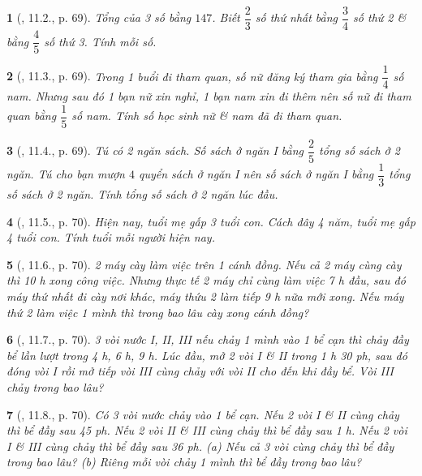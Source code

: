 \documentclass{article}
\newtheorem{baitoan}{}
\begin{document}
\begin{baitoan}[\cite{TLCT_THCS_Toan_6_so_hoc}, 11.2., p. 69]
	Tổng của 3 số bằng $147$. Biết $\dfrac{2}{3}$ số thứ nhất bằng $\dfrac{3}{4}$ số thứ 2 \& bằng $\dfrac{4}{5}$ số thứ 3. Tính mỗi số.
\end{baitoan}

\begin{baitoan}[\cite{TLCT_THCS_Toan_6_so_hoc}, 11.3., p. 69]
	Trong 1 buổi đi tham quan, số nữ đăng ký tham gia bằng $\dfrac{1}{4}$ số nam. Nhưng sau đó 1 bạn nữ xin nghỉ, 1 bạn nam xin đi thêm nên số nữ đi tham quan bằng $\dfrac{1}{5}$ số nam. Tính số học sinh nữ \& nam đã đi tham quan.
\end{baitoan}

\begin{baitoan}[\cite{TLCT_THCS_Toan_6_so_hoc}, 11.4., p. 69]
	Tú có 2 ngăn sách. Số sách ở ngăn I bằng $\dfrac{2}{5}$ tổng số sách ở 2 ngăn. Tú cho bạn mượn $4$ quyển sách ở ngăn I nên số sách ở ngăn I bằng $\dfrac{1}{3}$ tổng số sách ở 2 ngăn. Tính tổng số sách ở 2 ngăn lúc đầu.
\end{baitoan}

\begin{baitoan}[\cite{TLCT_THCS_Toan_6_so_hoc}, 11.5., p. 70]
	Hiện nay, tuổi mẹ gấp 3 tuổi con. Cách đây 4 năm, tuổi mẹ gấp 4 tuổi con. Tính tuổi mỗi người hiện nay.
\end{baitoan}

\begin{baitoan}[\cite{TLCT_THCS_Toan_6_so_hoc}, 11.6., p. 70]
	2 máy cày làm việc trên 1 cánh đồng. Nếu cả 2 máy cùng cày thì {\rm10 h} xong công việc. Nhưng thực tế 2 máy chỉ cùng làm việc {\rm7 h} đầu, sau đó máy thứ nhất đi cày nơi khác, máy thứu 2 làm tiếp {\rm9 h} nữa mới xong. Nếu máy thứ 2 làm việc 1 mình thì trong bao lâu cày xong cánh đồng?
\end{baitoan}

\begin{baitoan}[\cite{TLCT_THCS_Toan_6_so_hoc}, 11.7., p. 70]
	3 vòi nước I, II, III nếu chảy 1 mình vào 1 bể cạn thì chảy đầy bể lần lượt trong {\rm4 h, 6 h, 9 h}. Lúc đầu, mở 2 vòi I \& II trong {\rm1 h 30 ph}, sau đó đóng vòi I rồi mở tiếp vòi III cùng chảy với vòi II cho đến khi đầy bể. Vòi III chảy trong bao lâu?
\end{baitoan}

\begin{baitoan}[\cite{TLCT_THCS_Toan_6_so_hoc}, 11.8., p. 70]
	Có 3 vòi nước chảy vào 1 bể cạn. Nếu 2 vòi I \& II cùng chảy thì bể đầy sau {\rm45 ph}. Nếu 2 vòi II \& III cùng chảy thì bể đầy sau {\rm1 h}. Nếu 2 vòi I \& III cùng chảy thì bể đầy sau {\rm36 ph}. (a) Nếu cả 3 vòi cùng chảy thì bể đầy trong bao lâu? (b) Riêng mỗi vòi chảy 1 mình thì bể đầy trong bao lâu?
\end{baitoan}
\end{document}
